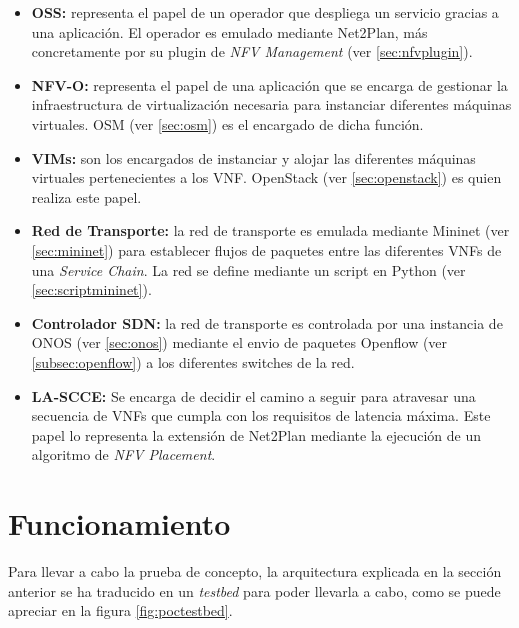 \begin{itemize}
	\item \textbf{\ac{OSS}:} representa el papel de un operador que despliega un servicio gracias a una aplicación. El operador es emulado mediante Net2Plan, más concretamente por su plugin de \textit{NFV Management} (ver \ref{sec:nfvplugin}).
	
	\item \textbf{\ac{NFV-O}:} representa el papel de una aplicación que se encarga de gestionar la infraestructura de virtualización necesaria para instanciar diferentes máquinas virtuales. \ac{OSM} (ver \ref{sec:osm}) es el encargado de dicha función.
	
	\item \textbf{\acp{VIM}:} son los encargados de instanciar y alojar las diferentes máquinas virtuales pertenecientes a los VNF. OpenStack (ver \ref{sec:openstack}) es quien realiza este papel.
	
	\item \textbf{Red de Transporte:} la red de transporte es emulada mediante Mininet (ver \ref{sec:mininet}) para establecer flujos de paquetes entre las diferentes \acp{VNF} de una \textit{Service Chain}. La red se define mediante un script en Python (ver \ref{sec:scriptmininet}).
	
	\item \textbf{Controlador \ac{SDN}:} la red de transporte es controlada por una instancia de \ac{ONOS} (ver \ref{sec:onos}) mediante el envio de paquetes Openflow (ver \ref{subsec:openflow}) a los diferentes switches de la red.
	
	\item \textbf{\ac{LA-SCCE}:} Se encarga de decidir el camino a seguir para atravesar una secuencia de \acp{VNF} que cumpla con los requisitos de latencia máxima. Este papel lo representa la extensión de Net2Plan mediante la ejecución de un algoritmo de \textit{NFV Placement}. 
\end{itemize}


\section{Funcionamiento}
\label{sec:funcprueba}

Para llevar a cabo la prueba de concepto, la arquitectura explicada en la sección anterior se ha traducido en un \textit{testbed} para poder llevarla a cabo, como se puede apreciar en la figura \ref{fig:poctestbed}.

